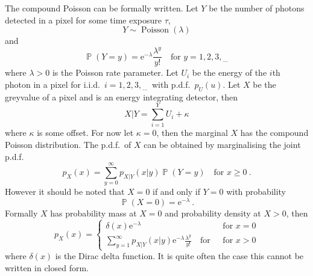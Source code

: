 \documentclass[12pt, a4paper]{memoir}
\DeclareMathOperator{\prob}{\mathbb{P}}
\DeclareMathOperator{\poisson}{Poisson}
\newcommand{\euler}{\mathrm{e}}
\newcommand{\dotdotdot}{_{\phantom{.}\cdots}}
\begin{document}
The compound Poisson can be formally written. Let $Y$ be the number of photons detected in a pixel for some time exposure $\tau$,
\begin{equation*}
Y\sim\poisson(\lambda)
\end{equation*}
and
\begin{equation*}
\prob(Y=y)=\euler^{-\lambda}\frac{\lambda^y}{y!} \quad \text{for }y=1,2,3,\dotdotdot
\end{equation*}
where $\lambda>0$ is the Poisson rate parameter. Let $U_i$ be the energy of the $i$th photon in a pixel for i.i.d.~$i=1,2,3,\dotdotdot$ with p.d.f.~$p_U(u)$. Let $X$ be the greyvalue of a pixel and is an energy integrating detector, then
\begin{equation}
X|Y = \sum_{i=1}^{Y}U_i+\kappa
\label{eq:compoundPoisson_X|Y}
\end{equation}
where $\kappa$ is some offset. For now let $\kappa=0$, then the marginal $X$ has the compound Poisson distribution. The p.d.f.~of $X$ can be obtained by marginalising the joint p.d.f.
\begin{equation*}
p_X(x)=\sum_{y=0}^\infty p_{X|Y}(x|y)\prob(Y=y) \quad\text{for }x\geqslant 0\ .
\end{equation*}
However it should be noted that $X=0$ if and only if $Y=0$ with probability
\begin{equation*}
\prob(X=0)=\euler^{-\lambda} \ .
\end{equation*}
Formally $X$ has probability mass at $X=0$ and probability density at $X>0$, then 
\begin{equation}
p_X(x) = 
\begin{cases}
\delta(x) \euler^{-\lambda}  & \text{ for } x=0 \\ 
\sum_{y=1}^\infty p_{X|Y}(x|y)\euler^{-\lambda}\frac{\lambda^y}{y!} \quad\text{for } & \text{ for } x>0
\end{cases}
\end{equation}
where $\delta(x)$ is the Dirac delta function. It is quite often the case this cannot be written in closed form.
\end{document}
